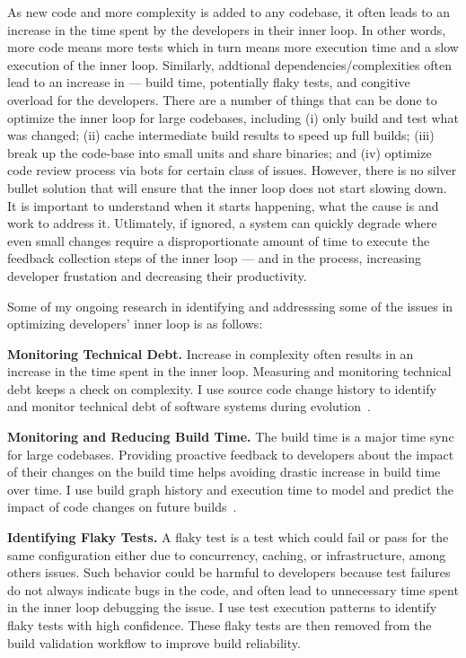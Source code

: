 \documentclass[a4paper]{article}
\begin{document}
As new code and more complexity is added to any codebase, it often leads to an increase in the time spent by the developers in their inner loop. In other words, more code means more tests which in turn means more execution time and a slow execution of the inner loop. Similarly, addtional dependencies/complexities often lead to an increase in --- build time, potentially flaky tests, and congitive overload for the developers.
There are a number of things that can be done to optimize the inner loop for large codebases, including (i) only build and test what was changed; (ii) cache intermediate build results to speed up full builds; (iii) break up the code-base into small units and share binaries; and (iv) optimize code review process via bots for certain class of issues.
However, there is no silver bullet solution that will ensure that the inner loop does not start slowing down. It is important to understand when it starts happening, what the cause is and work to address it. Utlimately, if ignored, a system can quickly degrade where even small changes require a disproportionate amount of time to execute the feedback collection steps of the inner loop --- and in the process, increasing developer frustation and decreasing their productivity. 

Some of my ongoing research in identifying and addresssing some of the issues in optimizing developers' inner loop is as follows:  

\noindent \textbf{Monitoring Technical Debt.} Increase in complexity often results in an increase in the time spent in the inner loop. Measuring and monitoring technical debt keeps a check on complexity. I use source code change history to identify and monitor technical debt of software systems during evolution~\cite{activefiles}. 

\noindent \textbf{Monitoring and Reducing Build Time.} The build time is a major time sync for large codebases.  Providing proactive feedback to developers about the impact of their changes on the build time helps avoiding drastic increase in build time over time. I use build graph history and execution time to model and predict the impact of code changes on future builds~\cite{buildimpact}. 

\noindent \textbf{Identifying Flaky Tests.}  A flaky test is a test which could fail or pass for the same configuration either due to concurrency, caching, or infrastructure, among others issues. Such behavior could be harmful to developers because test failures do not always indicate bugs in the code, and often lead to unnecessary time spent in the inner loop debugging the issue.  I use test execution patterns to identify flaky tests with high confidence.  These flaky tests are then removed from the build validation workflow to improve build reliability. 
\end{document}
